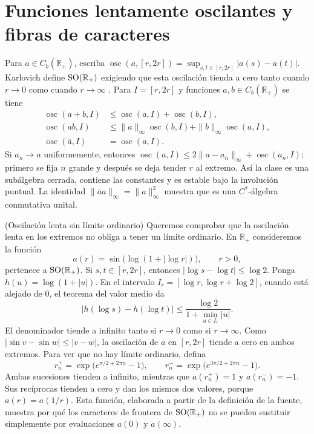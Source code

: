\section{Funciones lentamente oscilantes y fibras de caracteres}

Para $a\in C_b(\mathbb R_+)$, escriba
$\operatorname{osc}(a,[r,2r])=\sup_{s,t\in[r,2r]}|a(s)-a(t)|$.
Karlovich define $\operatorname{SO}(\mathbb R_+)$ exigiendo que esta oscilación tienda a
cero tanto cuando $r\to0$ como cuando $r\to\infty$
\cite[§2, pp.~465--466]{Karlovich2017}. Para $I=[r,2r]$ y funciones
$a,b\in C_b(\mathbb R_+)$ se tiene
\[
\begin{aligned}
 \operatorname{osc}(a+b,I)&\le\operatorname{osc}(a,I)+\operatorname{osc}(b,I),\\
 \operatorname{osc}(ab,I)&\le\|a\|_\infty\operatorname{osc}(b,I)
                         +\|b\|_\infty\operatorname{osc}(a,I),\\
 \operatorname{osc}(\overline a,I)&=\operatorname{osc}(a,I).
\end{aligned}
\]
Si $a_n\to a$ uniformemente, entonces
$\operatorname{osc}(a,I)\le2\|a-a_n\|_\infty+
\operatorname{osc}(a_n,I)$; primero se fija $n$ grande y después se
deja tender $r$ al extremo. Así la clase es una subálgebra cerrada,
contiene las constantes y es estable bajo la involución puntual.
La identidad $\|\overline a a\|_\infty=\|a\|_\infty^2$ muestra que
es una $C^*$-álgebra conmutativa unital.

\begin{cthejemplo}{(Oscilación lenta sin límite ordinario)}
Queremos comprobar que la oscilación lenta en los extremos no obliga a
tener un límite ordinario. En $\mathbb R_+$ consideremos la función
\[
 a(r)=\sin\!\bigl(\log(1+|\log r|)\bigr),\qquad r>0,
\]
pertenece a $\operatorname{SO}(\mathbb R_+)$. Si $s,t\in[r,2r]$, entonces
$|\log s-\log t|\le\log2$. Ponga $h(u)=\log(1+|u|)$.
En el intervalo $I_r=[\log r,\log r+\log2]$, cuando está alejado de $0$,
el teorema del valor medio da
\[
 |h(\log s)-h(\log t)|
 \le \frac{\log2}{1+\min_{u\in I_r}|u|}.
\]
El denominador tiende a infinito tanto si $r\to0$ como si $r\to\infty$.
Como $|\sin v-\sin w|\le|v-w|$, la oscilación de $a$ en $[r,2r]$
tiende a cero en ambos extremos. Para ver que no hay límite ordinario,
defina
\[
 r_n^+=\exp\!\bigl(e^{\pi/2+2\pi n}-1\bigr),\qquad
 r_n^-=\exp\!\bigl(e^{3\pi/2+2\pi n}-1\bigr).
\]
Ambas sucesiones tienden a infinito, mientras que
$a(r_n^+)=1$ y $a(r_n^-)=-1$. Sus recíprocas tienden a cero y dan
los mismos dos valores, porque $a(r)=a(1/r)$.
Esta función, elaborada a partir de la definición de la fuente, muestra por
qué los caracteres de frontera de $\operatorname{SO}(\mathbb R_+)$ no se pueden sustituir
simplemente por evaluaciones $a(0)$ y $a(\infty)$.
\end{cthejemplo}

